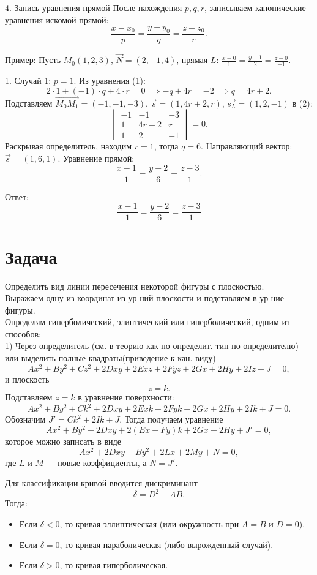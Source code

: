 \documentclass[a4paper,14pt]{extreport} %
\begin{document}
4.  Запись уравнения прямой   
   После нахождения \( p, q, r \), записываем канонические уравнения искомой прямой:  
   \[
   \frac{x - x_0}{p} = \frac{y - y_0}{q} = \frac{z - z_0}{r}.
   \]

 Пример: 
Пусть \( M_0(1, 2, 3) \), \( \vec{N} = (2, -1, 4) \), прямая \( L \):  
\( \frac{x - 0}{1} = \frac{y - 1}{2} = \frac{z - 0}{-1} \).

1.  Случай 1:  \( p = 1 \).  
   Из уравнения (1):  
   \[
   2 \cdot 1 + (-1) \cdot q + 4 \cdot r = 0 \implies -q + 4r = -2 \implies q = 4r + 2.
   \]  
   Подставляем \( \overrightarrow{M_0M_1} = (-1, -1, -3) \), \( \vec{s} = (1, 4r + 2, r) \), \( \vec{s_L} = (1, 2, -1) \) в (2):  
   \[
   \begin{vmatrix}
   -1 & -1 & -3 \\
   1 & 4r + 2 & r \\
   1 & 2 & -1
   \end{vmatrix} = 0.
   \]  
   Раскрывая определитель, находим \( r = 1 \), тогда \( q = 6 \).  
   Направляющий вектор: \( \vec{s} = (1, 6, 1) \).  
   Уравнение прямой:  
   \[
   \frac{x - 1}{1} = \frac{y - 2}{6} = \frac{z - 3}{1}.
   \]

 Ответ:   
\[
\boxed{\frac{x - 1}{1} = \frac{y - 2}{6} = \frac{z - 3}{1}}
\] 
\section*{Задача}
Определить вид линии пересечения некоторой фигуры с плоскостью. \\
Выражаем одну из координат из ур-ний плоскости и подставляем в ур-ние фигуры. \\
Определям гиперболический, элиптический или гиперболический, одним из способов:\\
1) Через определитель (см. в теорию как по определит. тип по определителю)\\
или выделить полные квадраты(приведение к кан. виду)\\

\[
Ax^2+By^2+Cz^2+2Dxy+2Exz+2Fyz+2Gx+2Hy+2Iz+J=0,
\]
и плоскость
\[
z=k.
\]
Подставляем \(z=k\) в уравнение поверхности:
\[
Ax^2+By^2+Ck^2+2Dxy+2Exk+2Fyk+2Gx+2Hy+2Ik+J=0.
\]
Обозначим \(J'=Ck^2+2Ik+J\). Тогда получаем уравнение
\[
Ax^2+By^2+2Dxy+2(Ex+Fy)k+2Gx+2Hy+J'=0,
\]
которое можно записать в виде
\[
Ax^2+2Dxy+By^2+2Lx+2My+N=0,
\]
где \(L\) и \(M\) — новые коэффициенты, а \(N=J'\).

Для классификации кривой вводится дискриминант
\[
\delta = D^2 - AB.
\]
Тогда:
\begin{itemize}
  \item Если \(\delta < 0\), то кривая эллиптическая (или окружность при \(A=B\) и \(D=0\)).
  \item Если \(\delta = 0\), то кривая параболическая (либо вырожденный случай).
  \item Если \(\delta > 0\), то кривая гиперболическая.
\end{itemize}
\end{document}
